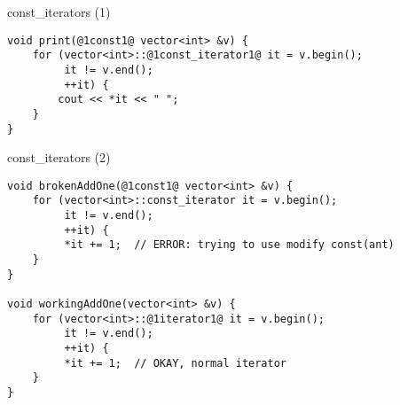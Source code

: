 \begin{frame}[fragile,label=constIt1]{const\_iterators (1)}
\begin{lstlisting}
void print(@1const1@ vector<int> &v) {
    for (vector<int>::@1const_iterator1@ it = v.begin();
         it != v.end();
         ++it) {
        cout << *it << " ";
    }
}
\end{lstlisting}
\end{frame}

\begin{frame}[fragile,label=constIt2]{const\_iterators (2)}
\begin{lstlisting}
void brokenAddOne(@1const1@ vector<int> &v) {
    for (vector<int>::const_iterator it = v.begin();
         it != v.end();
         ++it) {
         *it += 1;  // ERROR: trying to use modify const(ant)
    }
}

void workingAddOne(vector<int> &v) {
    for (vector<int>::@1iterator1@ it = v.begin();
         it != v.end();
         ++it) {
         *it += 1;  // OKAY, normal iterator
    }
}
\end{lstlisting}
\end{frame}
